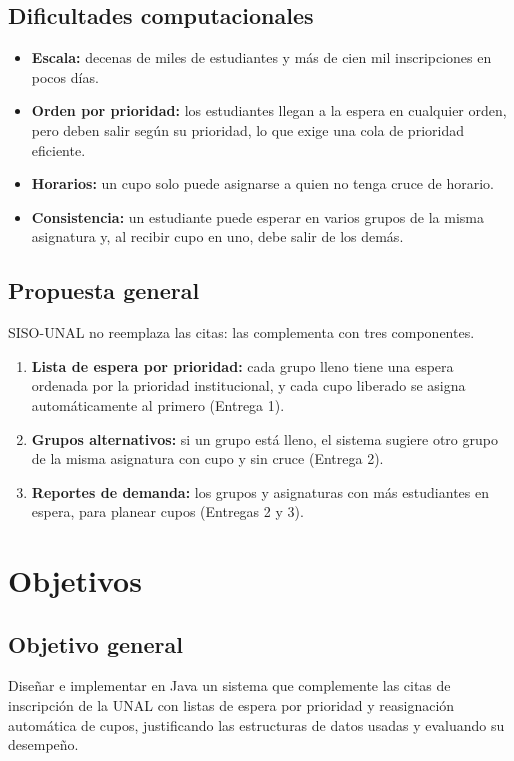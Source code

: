 \documentclass[conference]{IEEEtran}
\begin{document}
\subsection{Dificultades computacionales}
\begin{itemize}
    \item \textbf{Escala:} decenas de miles de estudiantes y más de cien mil inscripciones en pocos días.
    \item \textbf{Orden por prioridad:} los estudiantes llegan a la espera en cualquier orden, pero deben salir según su prioridad, lo que exige una cola de prioridad eficiente.
    \item \textbf{Horarios:} un cupo solo puede asignarse a quien no tenga cruce de horario.
    \item \textbf{Consistencia:} un estudiante puede esperar en varios grupos de la misma asignatura y, al recibir cupo en uno, debe salir de los demás.
\end{itemize}

\subsection{Propuesta general}
SISO-UNAL no reemplaza las citas: las complementa con tres componentes.
\begin{enumerate}
    \item \textbf{Lista de espera por prioridad:} cada grupo lleno tiene una espera ordenada por la prioridad institucional, y cada cupo liberado se asigna automáticamente al primero (Entrega 1).
    \item \textbf{Grupos alternativos:} si un grupo está lleno, el sistema sugiere otro grupo de la misma asignatura con cupo y sin cruce (Entrega 2).
    \item \textbf{Reportes de demanda:} los grupos y asignaturas con más estudiantes en espera, para planear cupos (Entregas 2 y 3).
\end{enumerate}


\section{Objetivos}

\subsection{Objetivo general}
Diseñar e implementar en Java un sistema que complemente las citas de inscripción de la UNAL con listas de espera por prioridad y reasignación automática de cupos, justificando las estructuras de datos usadas y evaluando su desempeño.
\end{document}
